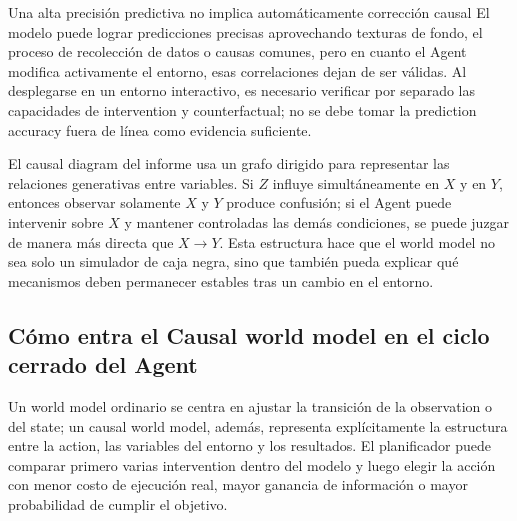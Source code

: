 
\begin{warningbox}{Una alta precisión predictiva no implica automáticamente corrección causal}
El modelo puede lograr predicciones precisas aprovechando texturas de fondo, el proceso de recolección de datos o causas comunes, pero en cuanto el Agent modifica activamente el entorno, esas correlaciones dejan de ser válidas. Al desplegarse en un entorno interactivo, es necesario verificar por separado las capacidades de intervention y counterfactual; no se debe tomar la prediction accuracy fuera de línea como evidencia suficiente.
\end{warningbox}

El causal diagram del informe usa un grafo dirigido para representar las relaciones generativas entre variables. Si $Z$ influye simultáneamente en $X$ y en $Y$, entonces observar solamente $X$ y $Y$ produce confusión; si el Agent puede intervenir sobre $X$ y mantener controladas las demás condiciones, se puede juzgar de manera más directa que $X\rightarrow Y$. Esta estructura hace que el world model no sea solo un simulador de caja negra, sino que también pueda explicar qué mecanismos deben permanecer estables tras un cambio en el entorno.


\subsection{Cómo entra el Causal world model en el ciclo cerrado del Agent}

Un world model ordinario se centra en ajustar la transición de la observation o del state; un causal world model, además, representa explícitamente la estructura entre la action, las variables del entorno y los resultados. El planificador puede comparar primero varias intervention dentro del modelo y luego elegir la acción con menor costo de ejecución real, mayor ganancia de información o mayor probabilidad de cumplir el objetivo.


